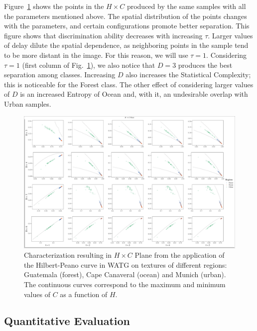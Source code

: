 \documentclass[journal]{IEEEtran}
\begin{document}
	Figure~\ref{fig:Regions} shows the points in the $H\times C$ produced by the same samples with all the parameters mentioned above.
	The spatial distribution of the points changes with the parameters,
	and certain configurations promote better separation.
	This figure shows that discrimination ability decreases with increasing $\tau$.
	Larger values of delay dilute the spatial dependence, as neighboring points in the sample tend to be more distant in the image.
	For this reason, we will use $\tau=1$.
	Considering $\tau=1$ (first column of Fig.~\ref{fig:Regions}), 
	we also notice that $D=3$ produces the best separation among classes.
	Increasing $D$ also increases the Statistical Complexity; this is noticeable for the Forest class.
	The other effect of considering larger values of $D$ is an increased Entropy of Ocean and, with it, an undesirable overlap with Urban samples.
	
	\begin{figure}
		\centering
		\includegraphics[width=1\textwidth]{Figures/WATGHC.pdf}
		\caption{Characterization resulting in $H \times C$ Plane from the application of the Hilbert-Peano curve in WATG on textures of different regions: Guatemala (forest), Cape Canaveral (ocean) and Munich (urban). 
		The continuous curves correspond to the maximum and minimum values of $C$ as a function of $H$.}
		\label{fig:Regions}
	\end{figure}
	
	\subsection{Quantitative Evaluation}
	
\end{document}

